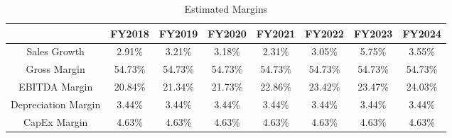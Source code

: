 \begin{table}[ht]
\centering
\begin{tabular}{@{}cccccccc@{}}
\toprule
                    & FY2018  & FY2019  & FY2020  & FY2021  & FY2022  & FY2023  & FY2024  \\ \midrule
Sales Growth        & 2.91\%  & 3.21\%  & 3.18\%  & 2.31\%  & 3.05\%  & 5.75\%  & 3.55\%  \\
Gross Margin        & 54.73\% & 54.73\% & 54.73\% & 54.73\% & 54.73\% & 54.73\% & 54.73\% \\
EBITDA Margin       & 20.84\% & 21.34\% & 21.73\% & 22.86\% & 23.42\% & 23.47\% & 24.03\% \\
Depreciation Margin & 3.44\%  & 3.44\%  & 3.44\%  & 3.44\%  & 3.44\%  & 3.44\%  & 3.44\%  \\
CapEx Margin        & 4.63\%  & 4.63\%  & 4.63\%  & 4.63\%  & 4.63\%  & 4.63\%  & 4.63\%  \\ \bottomrule
\end{tabular}
\caption{Estimated Margins}
\label{tab:part1-margins}
\end{table}
